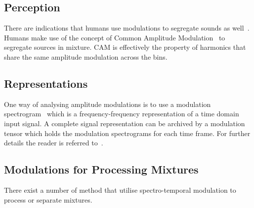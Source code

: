 \subsection{Perception}
There are indications that humans use modulations to segregate sounds as well~\cite{dau99}.
Humans make use of the concept of Common Amplitude Modulation~\cite{bregman90} to segregate sources in mixture.
CAM is effectively the property of harmonics that share the
same amplitude modulation across the bins.

\subsection{Representations}
One way of analysing amplitude modulations is to use a modulation spectrogram~\cite{greenberg97} which is a frequency-frequency
representation of a time domain input signal.
A complete signal representation can be archived by a modulation tensor which holds the modulation spectrograms for each time frame.
For further details the reader is referred to~\cite{barker15}.

\subsection{Modulations for Processing Mixtures}
There exist a number of method that utilise spectro-temporal modulation to process or separate mixtures.

